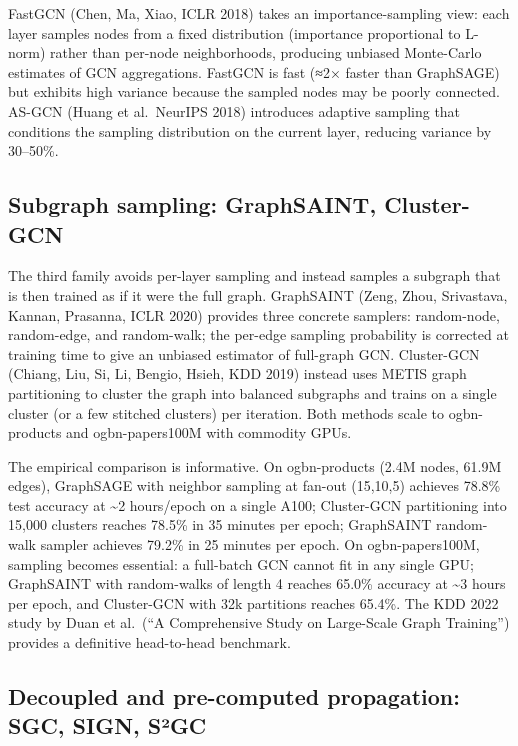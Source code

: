 FastGCN (Chen, Ma, Xiao, ICLR 2018) takes an importance-sampling view: each layer samples nodes from a fixed distribution (importance proportional to L-norm) rather than per-node neighborhoods, producing unbiased Monte-Carlo estimates of GCN aggregations. FastGCN is fast (≈2× faster than GraphSAGE) but exhibits high variance because the sampled nodes may be poorly connected. AS-GCN (Huang et al.~NeurIPS 2018) introduces adaptive sampling that conditions the sampling distribution on the current layer, reducing variance by 30--50\%.

\subsection{Subgraph sampling: GraphSAINT, Cluster-GCN}\label{subgraph-sampling-graphsaint-cluster-gcn}

The third family avoids per-layer sampling and instead samples a subgraph that is then trained as if it were the full graph. GraphSAINT (Zeng, Zhou, Srivastava, Kannan, Prasanna, ICLR 2020) provides three concrete samplers: random-node, random-edge, and random-walk; the per-edge sampling probability is corrected at training time to give an unbiased estimator of full-graph GCN. Cluster-GCN (Chiang, Liu, Si, Li, Bengio, Hsieh, KDD 2019) instead uses METIS graph partitioning to cluster the graph into balanced subgraphs and trains on a single cluster (or a few stitched clusters) per iteration. Both methods scale to ogbn-products and ogbn-papers100M with commodity GPUs.

The empirical comparison is informative. On ogbn-products (2.4M nodes, 61.9M edges), GraphSAGE with neighbor sampling at fan-out (15,10,5) achieves 78.8\% test accuracy at \textasciitilde2 hours/epoch on a single A100; Cluster-GCN partitioning into 15,000 clusters reaches 78.5\% in 35 minutes per epoch; GraphSAINT random-walk sampler achieves 79.2\% in 25 minutes per epoch. On ogbn-papers100M, sampling becomes essential: a full-batch GCN cannot fit in any single GPU; GraphSAINT with random-walks of length 4 reaches 65.0\% accuracy at \textasciitilde3 hours per epoch, and Cluster-GCN with 32k partitions reaches 65.4\%. The KDD 2022 study by Duan et al.~(``A Comprehensive Study on Large-Scale Graph Training'') provides a definitive head-to-head benchmark.

\subsection{Decoupled and pre-computed propagation: SGC, SIGN, S²GC}\label{decoupled-and-pre-computed-propagation-sgc-sign-suxb2gc}

